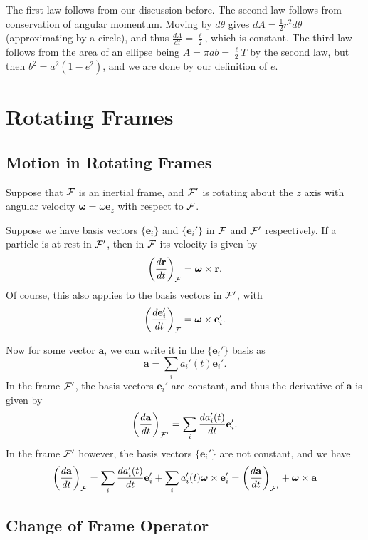 \documentclass[11pt, a4paper]{scrartcl}
\newcommand{\vv}[1]{\boldsymbol{\mathbf{#1}}}
\theoremstyle{definition}
\begin{document}
The first law follows from our discussion before. The second law follows from conservation of angular momentum. Moving by $d \theta$ gives $dA = \frac{1}{2}r^2 d \theta$ (approximating by a circle), and thus $\frac{dA}{dt} = \frac{\ell}{2}$, which is constant. The third law follows from the area of an ellipse being $A = \pi ab = \frac{\ell}{2}T$ by the second law, but then $b^2 = a^2(1 - e^2)$, and we are done by our definition of $e$.





\clearpage

\section{Rotating Frames}


\subsection*{Motion in Rotating Frames}

Suppose that $\mathcal{F}$ is an inertial frame, and $\mathcal{F}'$ is rotating about the $z$ axis with angular velocity $\vv \omega = \omega \vv e_z$ with respect to $\mathcal{F}$.

Suppose we have basis vectors $\{\vv e_i\}$ and $\{\vv e_i'\}$ in $\mathcal{F}$ and $\mathcal{F}'$ respectively. If a particle is at rest in $\mathcal{F}'$, then in $\mathcal{F}$ its velocity is given by
	$$
	\left(\frac{d \vv r}{d t}\right)_{\FF} = \vv \omega \times \vv r.
	$$
	Of course, this also applies to the basis vectors in $\mathcal{F}'$, with
	$$
	\left(\frac{d \vv e_i'}{d t}\right)_{\FF} =\vv \omega \times \vv e_i'.
	$$

	Now for some vector $\vv a$, we can write it in the $\{\vv e_i'\}$ basis as
	$$
\vv a = \sum_i a_i'(t) \vv e_i'.
$$
In the frame $\mathcal{F}'$, the basis vectors $\vv e_i'$ are constant, and thus the derivative of $\vv a$ is given by
$$
\left(\frac{d \vv a}{d t}\right)_{\FF'} = \sum_i \frac{d a_i'(t)}{dt} \vv{e}_i'.
$$
In the frame $\mathcal{F}'$ however, the basis vectors $\{\vv e_i'\}$ are not constant, and we have
$$
\left(\frac{d \vv a}{d t}\right)_{\FF} = \sum_i \frac{d a_i'(t)}{dt} \vv{e}_i' + \sum_i a_i'(t) \vv \omega \times \vv e_i' = \left(\frac{d \vv a}{d t}\right)_{\FF'} +\vv \omega \times \vv a
$$

\subsection*{Change of Frame Operator}
\end{document}
